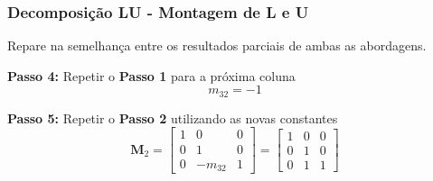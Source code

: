 \documentclass{beamer}
\theoremstyle{mystyle}
\begin{document}
\begin{frame}
	\frametitle{Decomposição LU - Montagem de L e U}
	Repare na semelhança entre os resultados parciais de ambas as abordagens.
	
	\textbf{Passo 4:} Repetir o \textbf{Passo 1} para a próxima coluna
	\begin{equation*}
		m_{32} = -1
	\end{equation*}
	
	\textbf{Passo 5:} Repetir o \textbf{Passo 2} utilizando as novas \alert{constantes}
	\begin{equation*}
		\mathbf{M}_{2} =
		\left[
		\begin{array}{ccc}
			1 & 0 & 0  \\
			0 & 1 & 0  \\
			0 & -m_{32} & 1
		\end{array}
		\right] 
		=
		\left[
		\begin{array}{ccc}
			1 & 0 & 0  \\
			0 & 1 & 0  \\
			0 & 1 & 1
		\end{array}
		\right]
	\end{equation*}
\end{frame}
\end{document}
